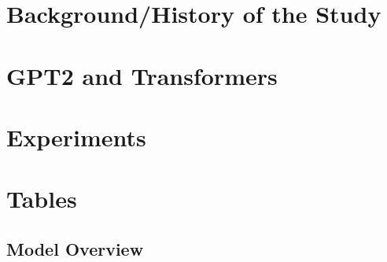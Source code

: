 \documentclass[english]{report}
\begin{document}
\newpage

\tableofcontents

\newpage
\listoffigures
\listoftables
\newpage
{}

	


\chapter{Background/History of the Study}



\chapter{GPT2 and Transformers}



\chapter{Experiments}



\appendix





\newpage
	
\chapter{Tables}
	
\section{Model Overview}
	
\end{document}
